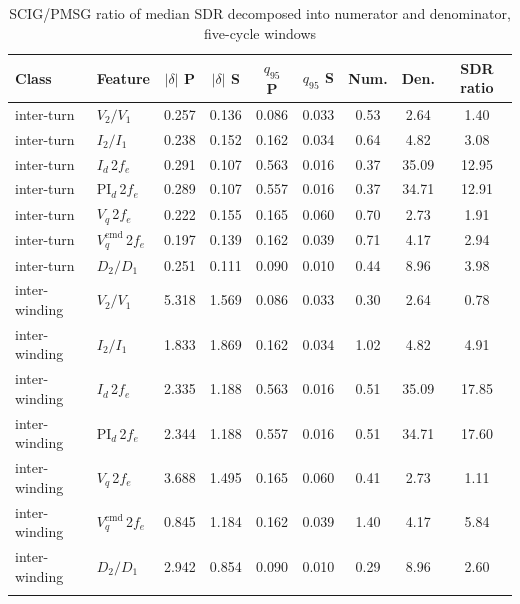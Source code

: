 \begin{table}[t]
\tabsize
\setlength{\tabcolsep}{3pt}
\caption{SCIG/PMSG ratio of median SDR decomposed into numerator and denominator, five-cycle windows}\label{tab:decomp}
\begin{tabular}{@{}llccccccc@{}}
\toprule
Class & Feature & $|\delta|$ P & $|\delta|$ S & $q_{95}$ P & $q_{95}$ S & Num. & Den. & SDR ratio \\
\midrule
inter-turn & $V_2/V_1$ & 0.257 & 0.136 & 0.086 & 0.033 & 0.53 & 2.64 & 1.40 \\
inter-turn & $I_2/I_1$ & 0.238 & 0.152 & 0.162 & 0.034 & 0.64 & 4.82 & 3.08 \\
inter-turn & $I_d$\,2$f_e$ & 0.291 & 0.107 & 0.563 & 0.016 & 0.37 & 35.09 & 12.95 \\
inter-turn & PI$_d$\,2$f_e$ & 0.289 & 0.107 & 0.557 & 0.016 & 0.37 & 34.71 & 12.91 \\
inter-turn & $V_q$\,2$f_e$ & 0.222 & 0.155 & 0.165 & 0.060 & 0.70 & 2.73 & 1.91 \\
inter-turn & $V_q^{\mathrm{cmd}}$\,2$f_e$ & 0.197 & 0.139 & 0.162 & 0.039 & 0.71 & 4.17 & 2.94 \\
inter-turn & $D_2/D_1$ & 0.251 & 0.111 & 0.090 & 0.010 & 0.44 & 8.96 & 3.98 \\
inter-winding & $V_2/V_1$ & 5.318 & 1.569 & 0.086 & 0.033 & 0.30 & 2.64 & 0.78 \\
inter-winding & $I_2/I_1$ & 1.833 & 1.869 & 0.162 & 0.034 & 1.02 & 4.82 & 4.91 \\
inter-winding & $I_d$\,2$f_e$ & 2.335 & 1.188 & 0.563 & 0.016 & 0.51 & 35.09 & 17.85 \\
inter-winding & PI$_d$\,2$f_e$ & 2.344 & 1.188 & 0.557 & 0.016 & 0.51 & 34.71 & 17.60 \\
inter-winding & $V_q$\,2$f_e$ & 3.688 & 1.495 & 0.165 & 0.060 & 0.41 & 2.73 & 1.11 \\
inter-winding & $V_q^{\mathrm{cmd}}$\,2$f_e$ & 0.845 & 1.184 & 0.162 & 0.039 & 1.40 & 4.17 & 5.84 \\
inter-winding & $D_2/D_1$ & 2.942 & 0.854 & 0.090 & 0.010 & 0.29 & 8.96 & 2.60 \\
\botrule
\end{tabular}
\end{table}
